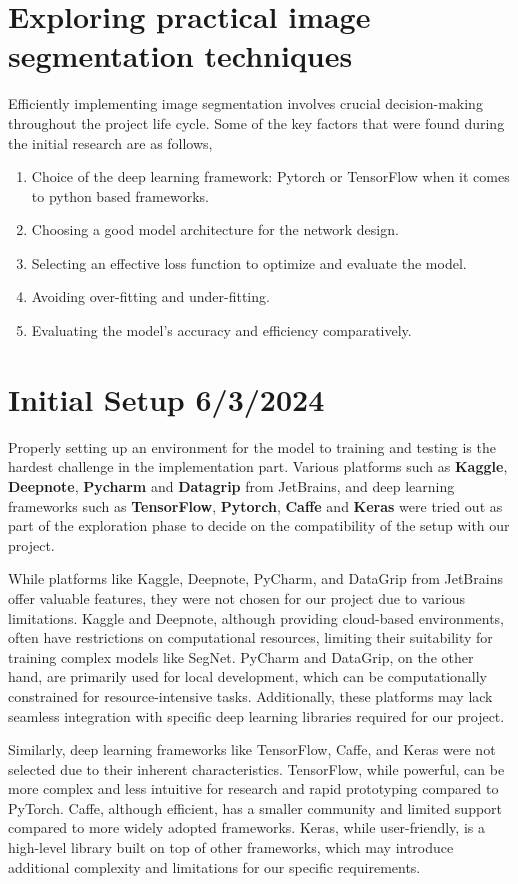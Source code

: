 \section{Exploring practical image segmentation techniques}
Efficiently implementing image segmentation involves crucial decision-making throughout the project life cycle. Some of the key factors that were found during the initial research are as follows,

\begin{enumerate}
  \item Choice of the deep learning framework: Pytorch or TensorFlow when it comes to python based frameworks.
  \item Choosing a good model architecture for the network design.
  \item Selecting an effective loss function to optimize and evaluate the model.
  \item Avoiding over-fitting and under-fitting.
  \item Evaluating the model's accuracy and efficiency comparatively.
\end{enumerate}

\section{Initial Setup 6/3/2024}
Properly setting up an environment for the model to training and testing is the hardest challenge in the implementation part. Various platforms such as \textbf{Kaggle}, \textbf{Deepnote}, \textbf{Pycharm} and \textbf{Datagrip} from JetBrains, and deep learning frameworks such as \textbf{TensorFlow}, \textbf{Pytorch}, \textbf{Caffe} and \textbf{Keras} were tried out as part of the exploration phase to decide on the compatibility of the setup with our project.

While platforms like Kaggle, Deepnote, PyCharm, and DataGrip from JetBrains offer valuable features, they were not chosen for our project due to various limitations. Kaggle and Deepnote, although providing cloud-based environments, often have restrictions on computational resources, limiting their suitability for training complex models like SegNet. PyCharm and DataGrip, on the other hand, are primarily used for local development, which can be computationally constrained for resource-intensive tasks. Additionally, these platforms may lack seamless integration with specific deep learning libraries required for our project.

Similarly, deep learning frameworks like TensorFlow, Caffe, and Keras were not selected due to their inherent characteristics. TensorFlow, while powerful, can be more complex and less intuitive for research and rapid prototyping compared to PyTorch. Caffe, although efficient, has a smaller community and limited support compared to more widely adopted frameworks. Keras, while user-friendly, is a high-level library built on top of other frameworks, which may introduce additional complexity and limitations for our specific requirements.

